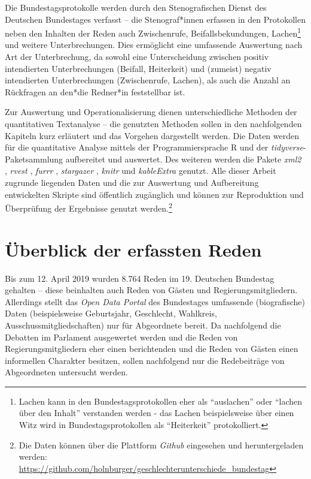 \documentclass[12pt, 
    twoside=false, 
    bibliography=totoc, 
    numbers=endperiod, 
    headings=normal, 
    toc=chapterentrydotfill
    ]{scrbook}
\begin{document}
Die Bundestagsprotokolle werden durch den Stenografischen Dienst des Deutschen Bundestages verfasst -- die Stenograf*innen erfassen in den Protokollen neben den Inhalten der Reden auch Zwischenrufe, Beifallsbekundungen, Lachen\footnote{Lachen kann in den Bundestagsprotokollen eher als \enquote{auslachen} oder \enquote{lachen über den Inhalt} verstanden werden - das Lachen beispielsweise über einen Witz wird in Bundestagsprotokollen als \enquote{Heiterkeit} protokolliert.} und weitere Unterbrechungen. Dies ermöglicht eine umfassende Auswertung nach Art der Unterbrechung, da sowohl eine Unterscheidung zwischen positiv intendierten Unterbrechungen (Beifall, Heiterkeit) und (zumeist) negativ intendierten Unterbrechungen (Zwischenrufe, Lachen), als auch die Anzahl an Rückfragen an den*die Redner*in feststellbar ist.

Zur Auswertung und Operationalisierung dienen unterschiedliche Methoden der quantitativen Textanalyse -- die genutzten Methoden sollen in den nachfolgenden Kapiteln kurz erläutert und das Vorgehen dargestellt werden. Die Daten werden für die quantitative Analyse mittels der Programmiersprache R \parencite{rcoreteam_2018} und der \emph{tidyverse}-Paketsammlung \parencite{wickham_2017} aufbereitet und auswertet. Des weiteren werden die Pakete \emph{xml2} \parencite{wickham_2018}, \emph{rvest} \parencite{wickham_2016}, \emph{furrr} \parencite{vaughan_2018}, \emph{stargazer} \parencite{hlavac_2018}, \emph{knitr} \parencite{xie_2014} und \emph{kableExtra} \parencite{zhu_2019} genutzt. 
Alle dieser Arbeit zugrunde liegenden Daten und die zur Auswertung und Aufbereitung entwickelten Skripte sind öffentlich zugänglich und können zur Reproduktion und Überprüfung der Ergebnisse genutzt werden.\footnote{Die Daten können über die Plattform \emph{Github} eingesehen und heruntergeladen werden: \url{https://github.com/holnburger/geschlechterunterschiede_bundestag}}

\section{Überblick der erfassten Reden}\label{kapitel:ueberblick_reden}

Bis zum 12. April 2019 wurden 8.764 Reden im 19. Deutschen Bundestag gehalten -- diese beinhalten auch Reden von Gästen und Regierungsmitgliedern. Allerdings stellt das \emph{Open Data Portal} des Bundestages umfassende (biografische) Daten (beispielsweise Geburtsjahr, Geschlecht, Wahlkreis, Ausschussmitgliedschaften) nur für Abgeordnete bereit. Da nachfolgend die Debatten im Parlament ausgewertet werden und die Reden von Regierungsmitgliedern eher einen berichtenden und die Reden von Gästen einen informellen Charakter besitzen, sollen nachfolgend nur die Redebeiträge von Abgeordneten untersucht werden.
\end{document}
